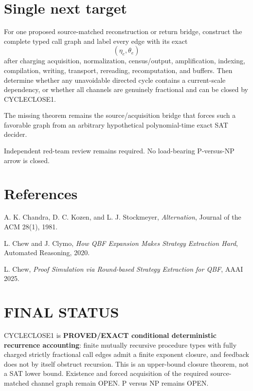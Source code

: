 \documentclass[11pt]{article}
\begin{document}
\section*{Single next target}
For one proposed source-matched reconstruction or return bridge, construct the complete typed call graph and label every edge with its exact
\[
(\eta_e,\theta_e)
\]
after charging acquisition, normalization, census/output, amplification, indexing, compilation, writing, transport, rereading, recomputation, and buffers. Then determine whether any unavoidable directed cycle contains a current-scale dependency, or whether all channels are genuinely fractional and can be closed by CYCLECLOSE1.

The missing theorem remains the source/acquisition bridge that forces such a favorable graph from an arbitrary hypothetical polynomial-time exact SAT decider.

Independent red-team review remains required. No load-bearing P-versus-NP arrow is closed.

\section*{References}
A. K. Chandra, D. C. Kozen, and L. J. Stockmeyer, \emph{Alternation}, Journal of the ACM 28(1), 1981.

L. Chew and J. Clymo, \emph{How QBF Expansion Makes Strategy Extraction Hard}, Automated Reasoning, 2020.

L. Chew, \emph{Proof Simulation via Round-based Strategy Extraction for QBF}, AAAI 2025.

\section*{FINAL STATUS}
CYCLECLOSE1 is \textbf{PROVED/EXACT conditional deterministic recurrence accounting}: finite mutually recursive procedure types with fully charged strictly fractional call edges admit a finite exponent closure, and feedback does not by itself obstruct recursion. This is an upper-bound closure theorem, not a SAT lower bound. Existence and forced acquisition of the required source-matched channel graph remain OPEN. P versus NP remains OPEN.

\end{document}
